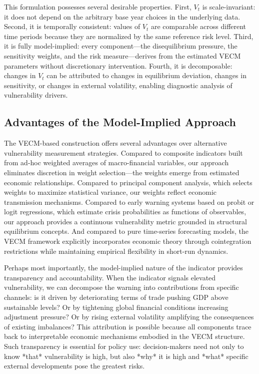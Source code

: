 \documentclass[12pt,a4paper]{article}
\numberwithin{equation}{section}
\theoremstyle{definition}
\theoremstyle{remark}
\begin{document}
This formulation possesses several desirable properties. First, $V_t$ is scale-invariant: it does not depend on the arbitrary base year choices in the underlying data. Second, it is temporally consistent: values of $V_t$ are comparable across different time periods because they are normalized by the same reference risk level. Third, it is fully model-implied: every component---the disequilibrium pressure, the sensitivity weights, and the risk measure---derives from the estimated VECM parameters without discretionary intervention. Fourth, it is decomposable: changes in $V_t$ can be attributed to changes in equilibrium deviation, changes in sensitivity, or changes in external volatility, enabling diagnostic analysis of vulnerability drivers.


\subsection{Advantages of the Model-Implied Approach}

The VECM-based construction offers several advantages over alternative vulnerability measurement strategies. Compared to composite indicators built from ad-hoc weighted averages of macro-financial variables, our approach eliminates discretion in weight selection---the weights emerge from estimated economic relationships. Compared to principal component analysis, which selects weights to maximize statistical variance, our weights reflect economic transmission mechanisms. Compared to early warning systems based on probit or logit regressions, which estimate crisis probabilities as functions of observables, our approach provides a continuous vulnerability metric grounded in structural equilibrium concepts. And compared to pure time-series forecasting models, the VECM framework explicitly incorporates economic theory through cointegration restrictions while maintaining empirical flexibility in short-run dynamics.

Perhaps most importantly, the model-implied nature of the indicator provides transparency and accountability. When the indicator signals elevated vulnerability, we can decompose the warning into contributions from specific channels: is it driven by deteriorating terms of trade pushing GDP above sustainable levels? Or by tightening global financial conditions increasing adjustment pressure? Or by rising external volatility amplifying the consequences of existing imbalances? This attribution is possible because all components trace back to interpretable economic mechanisms embodied in the VECM structure. Such transparency is essential for policy use: decision-makers need not only to know *that* vulnerability is high, but also *why* it is high and *what* specific external developments pose the greatest risks.
\end{document}
